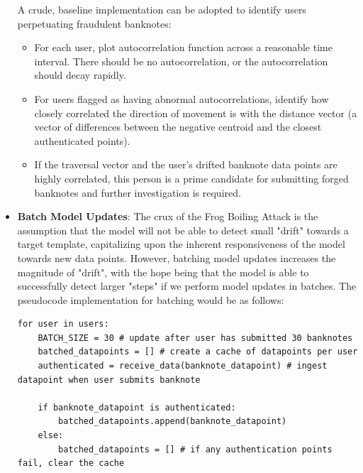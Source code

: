 \documentclass{article}
\begin{document}
\begin{itemize}
A crude, baseline implementation can be adopted to identify users perpetuating fraudulent banknotes:
\begin{itemize}
\item For each user, plot autocorrelation function across a reasonable time interval. There should be no autocorrelation, or the autocorrelation should decay rapidly.
\item For users flagged as having abnormal autocorrelations, identify how closely correlated the direction of movement is with the distance vector (a vector of differences between the negative centroid and the closest authenticated points).
\item If the traversal vector and the user's drifted banknote data points are highly correlated, this person is a prime candidate for submitting forged banknotes and further investigation is required.
\end{itemize}
  
\item \textbf{Batch Model Updates}: The crux of the Frog Boiling Attack is the assumption that the model will not be able to detect small "drift" towards a target template, capitalizing upon the inherent responsiveness of the model towards new data points. However, batching model updates increases the magnitude of "drift", with the hope being that the model is able to successfully detect larger "steps" if we perform model updates in batches. The pseudocode implementation for batching would be as follows:
\begin{lstlisting}
for user in users:
	BATCH_SIZE = 30 # update after user has submitted 30 banknotes
	batched_datapoints = [] # create a cache of datapoints per user
	authenticated = receive_data(banknote_datapoint) # ingest datapoint when user submits banknote
	
	if banknote_datapoint is authenticated:
		batched_datapoints.append(banknote_datapoint)
	else:
		batched_datapoints = [] # if any authentication points fail, clear the cache
		

\end{lstlisting}
\end{itemize}
\end{document}
